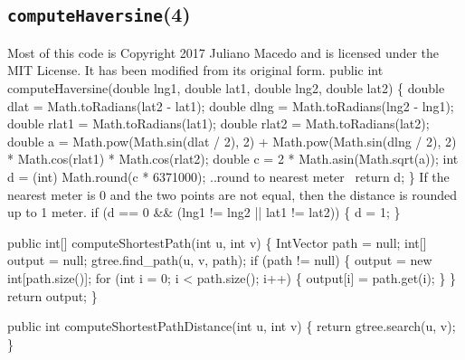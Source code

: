 \documentclass{article}
\def\nwendcode{\endtrivlist \endgroup}
\let\nwdocspar=\par
\begin{document}
\subsection{{\tt{}\protect{}computeHaversine}(4)}
Most of this code is Copyright 2017 Juliano Macedo and is licensed under the
MIT License. It has been modified from its original form.
\nwenddocs{}\endmoddef{}
public int computeHaversine(double lng1, double lat1, double lng2, double lat2) \{
  double dlat = Math.toRadians(lat2 - lat1);
  double dlng = Math.toRadians(lng2 - lng1);
  double rlat1 = Math.toRadians(lat1);
  double rlat2 = Math.toRadians(lat2);
  double a = Math.pow(Math.sin(dlat / 2), 2)
    + Math.pow(Math.sin(dlng / 2), 2)
    * Math.cos(rlat1) * Math.cos(rlat2);
  double c = 2 * Math.asin(Math.sqrt(a));
  int d = (int) Math.round(c * 6371000);
  \LA{}..round to nearest meter~{\nwtagstyle{}}\RA{}
  return d;
\}
\eatline
{}\nwendcode{}If the nearest meter is 0 and the two points are not equal, then the distance
is rounded up to 1 meter.
\nwenddocs{}\endmoddef{}
if (d == 0 && (lng1 != lng2 || lat1 != lat2)) \{
  d = 1;
\}
\nwendcode{}\nwdocspar

\nwenddocs{}\endmoddef{}
public int[] computeShortestPath(int u, int v) \{
  IntVector path = null;
  int[] output = null;
  gtree.find_path(u, v, path);
  if (path != null) \{
    output = new int[path.size()];
    for (int i = 0; i < path.size(); i++) \{
      output[i] = path.get(i);
    \}
  \}
  return output;
\}
\eatline
{}\nwendcode{}\nwdocspar
\nwenddocs{}\endmoddef{}
public int computeShortestPathDistance(int u, int v) \{
  return gtree.search(u, v);
\}
\nwendcode{}
\end{document}
